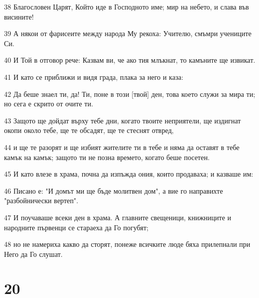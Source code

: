 \par 38 Благословен Царят, Който иде в Господното име; мир на небето, и слава във висините!
\par 39 А някои от фарисеите между народа Му рекоха: Учителю, смъмри учениците Си.
\par 40 И Той в отговор рече: Казвам ви, че ако тия млъкнат, то камъните ще извикат.
\par 41 И като се приближи и видя града, плака за него и каза:
\par 42 Да беше знаел ти, да! Ти, поне в този [твой] ден, това което служи за мира ти; но сега е скрито от очите ти.
\par 43 Защото ще дойдат върху тебе дни, когато твоите неприятели, ще издигнат окопи около тебе, ще те обсадят, ще те стеснят отвред,
\par 44 и ще те разорят и ще избият жителите ти в тебе и няма да оставят в тебе камък на камък; защото ти не позна времето, когато беше посетен.
\par 45 И като влезе в храма, почна да изпъжда ония, които продаваха; и казваше им:
\par 46 Писано е: "И домът ми ще бъде молитвен дом", а вие го направихте "разбойнически вертеп".
\par 47 И поучаваше всеки ден в храма. А главните свещеници, книжниците и народните първенци се стараеха да Го погубят;
\par 48 но не намериха какво да сторят, понеже всичките люде бяха прилепнали при Него да Го слушат.

\chapter{20}

